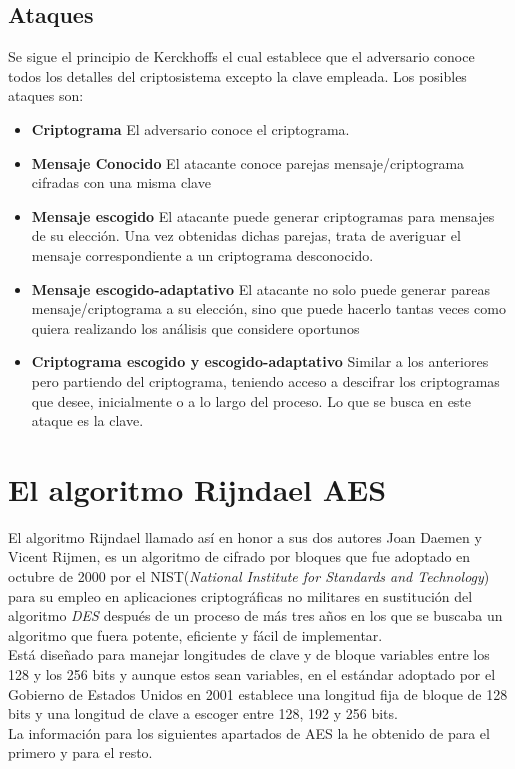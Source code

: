 \subsection{Ataques}
Se sigue el principio de Kerckhoffs el cual establece que el adversario conoce todos los detalles del criptosistema excepto la clave empleada. Los posibles ataques son:
\begin{itemize}
		\item \textbf{Criptograma} El adversario conoce el criptograma.
		\item \textbf{Mensaje Conocido} El atacante conoce parejas mensaje/criptograma cifradas con una misma clave
		\item \textbf{Mensaje escogido} El atacante puede generar criptogramas para mensajes de su elección. Una vez obtenidas dichas parejas, trata de averiguar el mensaje correspondiente a un criptograma desconocido.
		\item \textbf{Mensaje escogido-adaptativo} El atacante no solo puede generar pareas mensaje/criptograma a su elección, sino que puede hacerlo tantas veces como quiera realizando los análisis que considere oportunos
		\item \textbf{Criptograma escogido y escogido-adaptativo} Similar a los anteriores pero partiendo del criptograma, teniendo acceso a descifrar los criptogramas que desee, inicialmente o a lo largo del proceso. Lo que se busca en este ataque es la clave.
\end{itemize}
\section{El algoritmo Rijndael AES}
El algoritmo Rijndael llamado así en honor a sus dos autores Joan Daemen y Vicent Rijmen, es un algoritmo de cifrado por bloques que fue adoptado en octubre de 2000 por el NIST(\emph{National Institute for Standards and Technology}) para su empleo en aplicaciones criptográficas no militares en sustitución del algoritmo \emph{DES} después de un proceso de más tres años en los que se buscaba un algoritmo que fuera potente, eficiente y fácil de implementar.\\
Está diseñado para manejar longitudes de clave y de bloque variables entre los 128 y los 256 bits y aunque estos sean variables, en el estándar adoptado por el Gobierno de Estados Unidos en 2001 \cite{aesUsa} establece una longitud fija de bloque de 128 bits y una longitud de clave a escoger entre 128, 192 y 256 bits.\\
La información para los siguientes apartados de AES la he obtenido de \cite{GomezPardo2002b} para el primero y \cite{En2011} para el resto.

